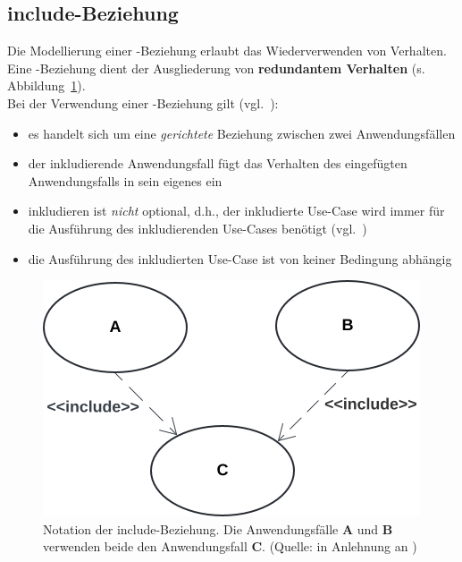 \subsection{include-Beziehung}

Die Modellierung einer -Beziehung erlaubt das Wiederverwenden von Verhalten.\\

\noindent
Eine -Beziehung dient der Ausgliederung von \textbf{redundantem Verhalten} (s. Abbildung~\ref{fig:usecase-include}).\\

\noindent
Bei der Verwendung einer -Beziehung gilt (vgl.~\cite[53]{Buh09}):


\begin{itemize}
    \item es handelt sich um eine \textit{gerichtete} Beziehung zwischen zwei Anwendungsfällen
    \item der inkludierende Anwendungsfall fügt das Verhalten des eingefügten Anwendungsfalls in sein eigenes ein
    \item inkludieren ist \textit{nicht} optional, d.h., der inkludierte Use-Case wird immer für die Ausführung des inkludierenden Use-Cases benötigt (vgl.~\cite[65 f.]{Bal05})
    \item die Ausführung des inkludierten Use-Case ist von keiner Bedingung abhängig
\end{itemize}

\begin{figure}
    \centering
    \includegraphics[scale=0.4]{part three/Anwendungsfalldiagramm/img/usecase-include}
    \caption{Notation der include-Beziehung. Die Anwendungsfälle \textbf{A} und \textbf{B} verwenden beide den Anwendungsfall \textbf{C}. (Quelle: in Anlehnung an \cite[66, Abb. 2.8-5]{Bal05})}
    \label{fig:usecase-include}
\end{figure}



